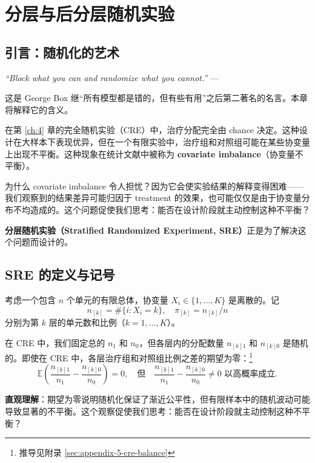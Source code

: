 
\chapter{分层与后分层随机实验}\label{ch:5}

\section{引言：随机化的艺术}\label{sec:5-intro}

\textit{``Block what you can and randomize what you cannot.''}
--- \citep[page 103]{BoxHunterHunter:1978}

这是 George Box 继``所有模型都是错的，但有些有用''之后第二著名的名言。本章将解释它的含义。

在第 \ref{ch:4} 章的完全随机实验（CRE）中，治疗分配完全由 chance 决定。这种设计在大样本下表现优异，但在一个有限实验中，治疗组和对照组可能在某些协变量上出现不平衡。这种现象在统计文献中被称为 \textbf{covariate imbalance}（协变量不平衡）。

为什么 covariate imbalance 令人担忧？因为它会使实验结果的解释变得困难——我们观察到的结果差异可能归因于 treatment 的效果，也可能仅仅是由于协变量分布不均造成的。这个问题促使我们思考：能否在设计阶段就主动控制这种不平衡？

\textbf{分层随机实验（Stratified Randomized Experiment, SRE）}正是为了解决这个问题而设计的。

\section{SRE 的定义与记号}\label{sec:5-sre-definition}

考虑一个包含 $n$ 个单元的有限总体，协变量 $X_i \in \{1, \dots, K\}$ 是离散的。记
\[
n_{[k]} = \#\{i: X_i = k\}, \quad \pi_{[k]} = n_{[k]} / n
\]
分别为第 $k$ 层的单元数和比例（$k = 1, \dots, K$）。

在 CRE 中，我们固定总的 $n_1$ 和 $n_0$，但各层内的分配数量 $n_{[k]1}$ 和 $n_{[k]0}$ 是随机的。即使在 CRE 中，各层治疗组和对照组比例之差的期望为零：\footnote{推导见附录 \cref{sec:appendix-5-cre-balance}}
\[
\mathbb{E}\left( \frac{n_{[k]1}}{n_1} - \frac{n_{[k]0}}{n_0} \right) = 0,
\quad \text{但} \quad
\frac{n_{[k]1}}{n_1} - \frac{n_{[k]0}}{n_0} \neq 0 \text{ 以高概率成立}.
\label{eq:5-cre-balance}
\]

\textbf{直观理解}：期望为零说明随机化保证了渐近公平性，但有限样本中的随机波动可能导致显著的不平衡。这个观察促使我们思考：能否在设计阶段就主动控制这种不平衡？

